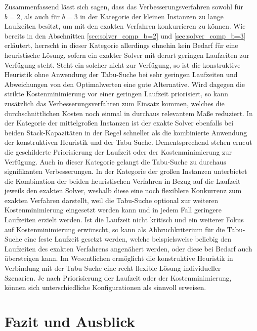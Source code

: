 Zusammenfassend lässt sich sagen, dass das Verbesserungsverfahren sowohl für $b = 2$,
als auch für $b = 3$ in der Kategorie der kleinen Instanzen zu lange Laufzeiten besitzt,
um mit den exakten Verfahren konkurrieren zu können.
Wie bereits in den Abschnitten \ref{sec:solver_comp_b=2} und \ref{sec:solver_comp_b=3} erläutert,
herrscht in dieser Kategorie allerdings ohnehin kein Bedarf für eine heuristische Lösung,
sofern ein exakter Solver mit derart geringen Laufzeiten zur Verfügung steht.
Steht ein solcher nicht zur Verfügung, so ist die konstruktive Heuristik ohne Anwendung der
Tabu-Suche bei sehr geringen Laufzeiten und Abweichungen von den Optimalwerten eine gute Alternative.
Wird dagegen die strikte Kostenminimierung vor einer geringen Laufzeit priorisiert, so kann zusätzlich das Verbesserungsverfahren zum Einsatz kommen, welches die durchschnittlichen Kosten noch einmal in durchaus
relevantem Maße reduziert.
In der Kategorie der mittelgroßen Instanzen ist der exakte Solver ebenfalls bei beiden Stack-Kapazitäten
in der Regel schneller als die kombinierte Anwendung der konstruktiven Heuristik und der Tabu-Suche.
Dementsprechend stehen erneut die geschilderte Priorisierung der Laufzeit oder der Kostenminimierung zur
Verfügung. Auch in dieser Kategorie gelangt die Tabu-Suche zu durchaus signifikanten Verbesserungen.
In der Kategorie der großen Instanzen unterbietet die Kombination der beiden heuristischen Verfahren
in Bezug auf die Laufzeit jeweils den exakten Solver, weshalb diese eine noch flexiblere Konkurrenz
zum exakten Verfahren darstellt, weil die Tabu-Suche optional zur weiteren Kostenminimierung eingesetzt werden
kann und in jedem Fall geringere Laufzeiten erzielt werden. Ist die Laufzeit nicht kritisch und ein weiterer
Fokus auf Kostenminimierung erwünscht, so kann als Abbruchkriterium für die Tabu-Suche eine feste Laufzeit
gesetzt werden, welche beispielsweise beliebig den Laufzeiten des exakten Verfahrens angenähert werden,
oder diese bei Bedarf auch übersteigen kann. Im Wesentlichen ermöglicht die konstruktive Heuristik in
Verbindung mit der Tabu-Suche eine recht flexible Lösung individueller Szenarien. Je nach Priorisierung
der Laufzeit oder der Kostenminimierung, können sich unterschiedliche Konfigurationen als sinnvoll erweisen.

\vfill
\pagebreak

\section{Fazit und Ausblick}
\label{sec:conclusion}

